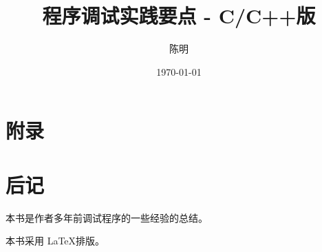 \documentclass[fontset=windows,UTF8,zihao=-4,a4paper,openright]{ctexbook}
\begin{document}
\title{程序调试实践要点 - C/C++版}
\author{陈明}
\date{\today}

\maketitle

\cleardoublepage   %
\tableofcontents

\cleardoublepage   %
\listoffigures

\cleardoublepage   %
\listoftables























\appendix

\chapter{附录}

%
%
%
%
%
%

\chapter{后记}

本书是作者多年前调试程序的一些经验的总结。

本书采用 \LaTeX 排版。



\cleardoublepage   %

%


\printindex
\end{document}
